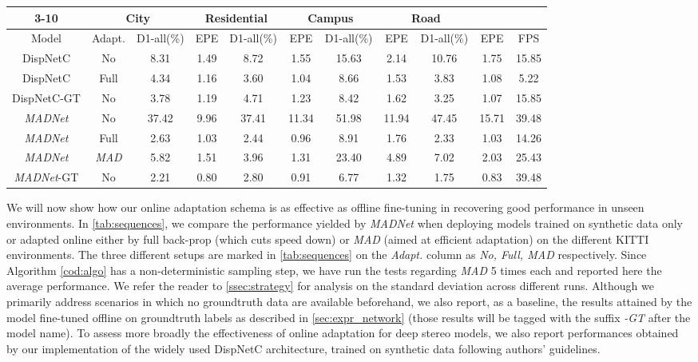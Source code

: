 \documentclass[10pt,twocolumn,letterpaper]{article}
\def\netname{\emph{MADNet}}
\def\algoname{\emph{MAD}}
\begin{document}
\begin{table*}[t]
	\center
	\begin{tabular}{|c|c|cc|cc|cc|cc|c|}
		\cline{3-10}
		\multicolumn{2}{c}{} & \multicolumn{2}{|c|}{City} & \multicolumn{2}{c|}{Residential} & \multicolumn{2}{c|}{Campus} & \multicolumn{2}{c|}{Road} \\
		\hline
		Model & Adapt. & D1-all(\%) & EPE & D1-all(\%) & EPE & D1-all(\%) & EPE & D1-all(\%) & EPE & FPS\\ 
		\hline
		DispNetC & No & 8.31 & 1.49 & 8.72 & 1.55 & 15.63  & 2.14 & 10.76  & 1.75 & 15.85\\ 
		DispNetC & Full & 4.34  & 1.16  & 3.60 & 1.04 & 8.66  & 1.53 & 3.83 & 1.08 & 5.22 \\
		DispNetC-GT & No & 3.78 & 1.19  & 4.71  & 1.23  & 8.42 & 1.62 & 3.25 & 1.07  & 15.85 \\
		\hline
		\netname{} & No & 37.42 & 9.96 & 37.41 & 11.34 & 51.98 & 11.94 & 47.45 & 15.71 & 39.48\\
		\netname{} & Full & 2.63 & 1.03 & 2.44 & 0.96 & 8.91 & 1.76 & 2.33 & 1.03 & 14.26\\ 
		\netname{} & \algoname{} & 5.82 & 1.51 & 3.96 & 1.31 & 23.40 & 4.89 & 7.02 & 2.03 & 25.43\\ 
		\netname{}-GT & No & 2.21 & 0.80 & 2.80 & 0.91 & 6.77 & 1.32 & 1.75 & 0.83 & 39.48\\
		\hline
	\end{tabular}
	\caption{Performance on the \emph{City}, \emph{Residential}, \emph{Campus} and \emph{Road} sequences from KITTI \cite{KITTI_RAW}. For both DispNetC and \netname{} with and without online adaptations.}
	\label{tab:sequences}
\end{table*}

We will now show how our online adaptation schema is as effective as offline fine-tuning in recovering good performance in unseen environments. In \autoref{tab:sequences}, we compare the performance yielded by \netname{} when deploying  models trained on synthetic data only \cite{mayer2016large} or adapted online either by full back-prop (which cuts speed down) or \algoname{} (aimed at efficient adaptation) on the different KITTI environments. The three different setups are marked in \autoref{tab:sequences} on the \textit{Adapt.} column as \textit{No, Full, \algoname{}} respectively. Since Algorithm \autoref{cod:algo} has a non-deterministic sampling step, we have run the tests regarding \algoname{} 5 times each and reported here the average performance. We refer the reader to \autoref{ssec:strategy} for analysis on the standard deviation across different runs.  Although we primarily address scenarios in which no groundtruth data are available beforehand, we also report, as a baseline, the results attained by the model fine-tuned offline on groundtruth labels as described in \autoref{sec:expr_network} (those results will be tagged with the suffix \textit{-GT} after the model name). To assess more broadly the effectiveness of online adaptation for deep stereo models, we also report performances obtained by our implementation of the widely used DispNetC \cite{mayer2016large} architecture, trained on synthetic data following authors' guidelines.  
\end{document}
